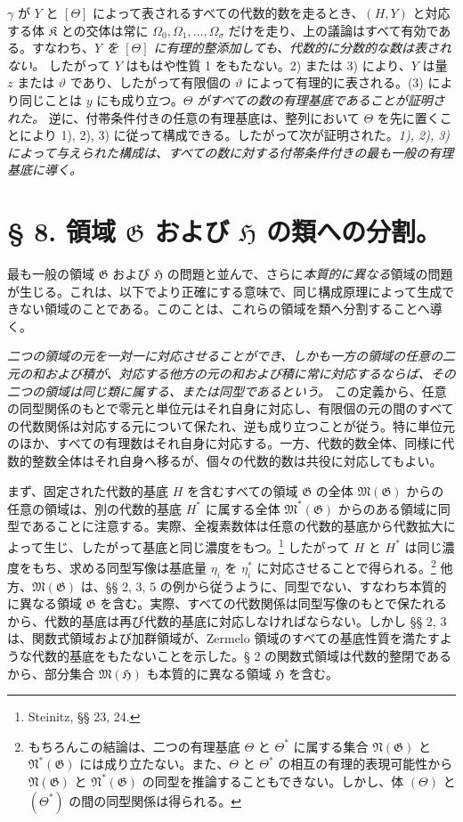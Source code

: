 $\gamma$ が $Y$ と $[\Theta]$ によって表されるすべての代数的数を走るとき、$(H,Y)$ と対応する体 $\mathfrak K$ との交体は常に $\Omega_0,\Omega_1,\ldots,\Omega_\sigma$ だけを走り、上の議論はすべて有効である。すなわち、\emph{$Y$ を $[\Theta]$ に有理的整添加しても、代数的に分数的な数は表されない。} したがって $Y$ はもはや性質 1 をもたない。2) または 3) により、$Y$ は量 $z$ または $\vartheta$ であり、したがって有限個の $\vartheta$ によって有理的に表される。(3) により同じことは $y$ にも成り立つ。\emph{$\Theta$ がすべての数の有理基底であることが証明された。} 逆に、付帯条件付きの任意の有理基底は、整列において $\Theta$ を先に置くことにより 1), 2), 3) に従って構成できる。したがって次が証明された。\emph{1), 2), 3) によって与えられた構成は、すべての数に対する付帯条件付きの最も一般の有理基底に導く。}

\section*{§ 8. 領域 $\mathfrak G$ および $\mathfrak H$ の類への分割。}

最も一般の領域 $\mathfrak G$ および $\mathfrak H$ の問題と並んで、さらに\emph{本質的に異なる}領域の問題が生じる。これは、以下でより正確にする意味で、同じ構成原理によって生成できない領域のことである。このことは、これらの領域を類へ分割することへ導く。

\emph{二つの領域の元を一対一に対応させることができ、しかも一方の領域の任意の二元の和および積が、対応する他方の元の和および積に常に対応するならば、その二つの領域は同じ類に属する、または同型であるという。} この定義から、任意の同型関係のもとで零元と単位元はそれ自身に対応し、有限個の元の間のすべての代数関係は対応する元について保たれ、逆も成り立つことが従う。特に単位元のほか、すべての有理数はそれ自身に対応する。一方、代数的数全体、同様に代数的整数全体はそれ自身へ移るが、個々の代数的数は共役に対応してもよい。

まず、固定された代数的基底 $H$ を含むすべての領域 $\mathfrak G$ の全体 $\mathfrak M(\mathfrak G)$ からの任意の領域は、別の代数的基底 $H^*$ に属する全体 $\mathfrak M^*(\mathfrak G)$ からのある領域に同型であることに注意する。実際、全複素数体は任意の代数的基底から代数拡大によって生じ、したがって基底と同じ濃度をもつ。\footnote{Steinitz, §§ 23, 24.} したがって $H$ と $H^*$ は同じ濃度をもち、求める同型写像は基底量 $\eta_i$ を $\eta_i^*$ に対応させることで得られる。\footnote{もちろんこの結論は、二つの有理基底 $\Theta$ と $\Theta^*$ に属する集合 $\mathfrak N(\mathfrak G)$ と $\mathfrak N^*(\mathfrak G)$ には成り立たない。また、$\Theta$ と $\Theta^*$ の相互の有理的表現可能性から $\mathfrak N(\mathfrak G)$ と $\mathfrak N^*(\mathfrak G)$ の同型を推論することもできない。しかし、体 $(\Theta)$ と $(\Theta^*)$ の間の同型関係は得られる。} 他方、$\mathfrak M(\mathfrak G)$ は、§§ 2, 3, 5 の例から従うように、同型でない、すなわち本質的に異なる領域 $\mathfrak G$ を含む。実際、すべての代数関係は同型写像のもとで保たれるから、代数的基底は再び代数的基底に対応しなければならない。しかし §§ 2, 3 は、関数式領域および加群領域が、Zermelo 領域のすべての基底性質を満たすような代数的基底をもたないことを示した。§ 2 の関数式領域は代数的整閉であるから、部分集合 $\mathfrak M(\mathfrak H)$ も本質的に異なる領域 $\mathfrak H$ を含む。

